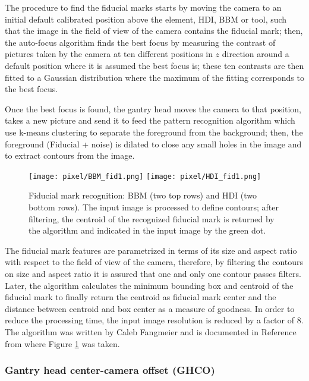 The procedure to find the fiducial marks starts by moving the camera to an initial default calibrated position above the element, HDI, BBM or tool, such that the image in the field of view of the camera contains the fiducial mark; then, the auto-focus algorithm finds the best focus by measuring the contrast of pictures taken by the camera at ten different positions in $z$ direction around a default position where it is assumed the best focus is; these ten contrasts are then fitted to a Gaussian distribution where the maximum of the fitting corresponds to the best focus.     

Once the best focus is found, the gantry head moves the camera to that position, takes a new picture and send it to feed the pattern recognition algorithm which use k-means clustering to separate the foreground from the background; then, the foreground (Fiducial + noise) is dilated to close any small holes in the image and to extract contours from the image.

\begin{figure}[!ht]
  \centering  
  \texttt{[image: pixel/BBM\_fid1.png]}
  \texttt{[image: pixel/HDI\_fid1.png]}
  \caption[Fiducial mark recognition.]{Fiducial mark recognition: BBM (two top rows) and HDI (two bottom rows). The input image is processed to define contours; after filtering, the centroid of the recognized fiducial mark is returned by the algorithm and indicated in the input image by the green dot.}\label{fig:BBM_fid1}
\end{figure}

The fiducial mark features are parametrized in terms of its size and aspect ratio with respect to the field of view of the camera, therefore, by filtering the contours on size and aspect ratio it is assured that one and only one contour passes filters. Later, the algorithm calculates the minimum bounding box and centroid of the fiducial mark to finally return the centroid as fiducial mark center and the distance between centroid and box center as a measure of goodness. In order to reduce the processing time, the input image resolution is reduced by a factor of 8. The algorithm was written by Caleb Fangmeier and is documented in Reference \cite{pr_algorithm} from where Figure \ref{fig:BBM_fid1} was taken.

\subsubsection*{Gantry head center-camera offset (GHCO)}

